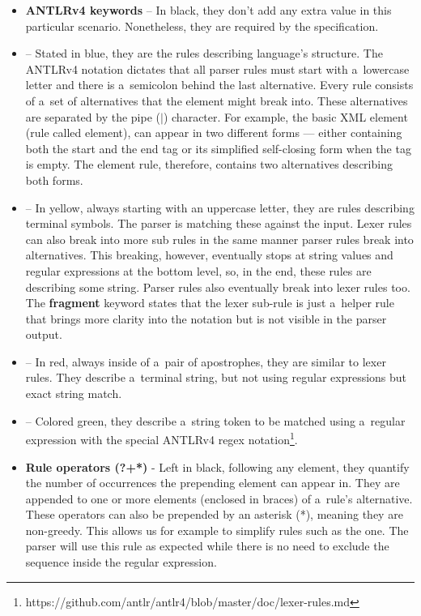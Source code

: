 \begin{itemize}
	\item \textbf{ANTLRv4 keywords} -- In black, they don't add any extra value in this particular scenario.
	Nonetheless, they are required by the specification.

	\item {} -- Stated in blue, they are the rules describing language's structure.
	The ANTLRv4 notation dictates that all parser rules must start with a~lowercase letter and there is a~semicolon behind the last alternative.
	Every rule consists of a~set of alternatives that the element might break into.
	These alternatives are separated by the pipe ($|$) character.
	For example, the basic XML element (rule called element), can appear in two different forms --- either containing both the start and the end tag or its simplified self-closing form when the tag is empty.
	The element rule, therefore, contains two alternatives describing both forms.

	\item {} -- In yellow, always starting with an uppercase letter, they are rules describing terminal symbols.
	The parser is matching these against the input.
	Lexer rules can also break into more sub rules in the same manner parser rules break into alternatives.
	This breaking, however, eventually stops at string values and regular expressions at the bottom level, so, in the end, these rules are describing some string.
	Parser rules also eventually break into lexer rules too.
	The \textbf{fragment} keyword states that the lexer sub-rule is just a~helper rule that brings more clarity into the notation but is not visible in the parser output.

	\item {} -- In red, always inside of a~pair of apostrophes, they are similar to lexer rules.
	They describe a~terminal string, but not using regular expressions but exact string match.

	\item {} -- Colored green, they describe a~string token to be matched using a~regular expression with the special ANTLRv4 regex notation\footnote{https://github.com/antlr/antlr4/blob/master/doc/lexer-rules.md}.

	\item \textbf{Rule operators (?+*)} - Left in black, following any element, they quantify the number of occurrences the prepending element can appear in.
	They are appended to one or more elements (enclosed in braces) of a~rule's alternative.
	These operators can also be prepended by an asterisk (*), meaning they are non-greedy.
	This allows us for example to simplify rules such as the  one.
	The parser will use this rule as expected while there is no need to exclude the \literal{\texttt{]]>}} sequence inside the regular expression.
\end{itemize}
